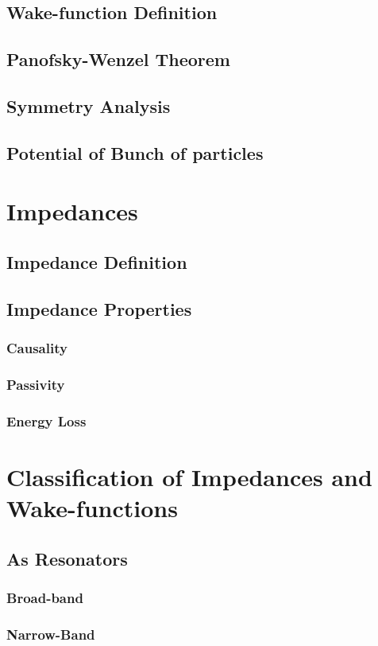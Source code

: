 \documentclass[
	12pt,				%
	openright,			%
	oneside,			%
	a4paper,		%
	chapter=TITLE,		%
	section=TITLE,		%
    brazil,				%
	english,			%
	sumario=tradicional,
	]{abntex2}
\begin{document}
    \subsection{Wake-function Definition}
    \subsection{Panofsky-Wenzel Theorem}
    \subsection{Symmetry Analysis}
    \subsection{Potential of Bunch of particles}
  \section{Impedances}
    \subsection{Impedance Definition}
    \subsection{Impedance Properties}
      \subsubsection{Causality}
      \subsubsection{Passivity}
      \subsubsection{Energy Loss}
  \section{Classification of Impedances and Wake-functions}
    \subsection{As Resonators}
      \subsubsection{Broad-band}
      \subsubsection{Narrow-Band}
\end{document}
